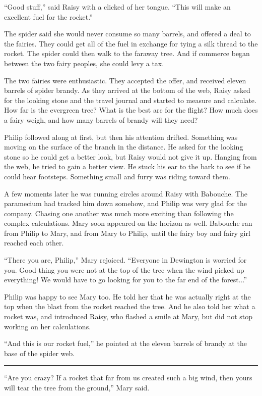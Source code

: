 \documentclass[10pt, draft]{memoir}
\renewcommand{\pfbreakdisplay}{\bigskip \ding{166} \bigskip}
\newcommand{\secbreak}{\fancybreak{\pfbreakdisplay}}
\begin{document}
``Good stuff,'' said Raisy with a clicked of her tongue. ``This will make an excellent fuel for the rocket.''

The spider said she would never consume so many barrels, and offered a deal to the fairies. They could get all of the fuel in exchange for tying a silk thread to the rocket. The spider could then walk to the faraway tree. And if commerce began between the two fairy peoples, she could levy a tax.

The two fairies were enthusiastic. They accepted the offer, and received eleven barrels of spider brandy. As they arrived at the bottom of the web, Raisy asked for the looking stone and the travel journal and started to measure and calculate. How far is the evergreen tree? What is the best arc for the flight? How much does a fairy weigh, and how many barrels of brandy will they need?

Philip followed along at first, but then his attention drifted. Something was moving on the surface of the branch in the distance. He asked for the looking stone so he could get a better look, but Raisy would not give it up. Hanging from the web, he tried to gain a better view. He stuck his ear to the bark to see if he could hear footsteps. Something small and furry was riding toward them.

A few moments later he was running circles around Raisy with Babouche. The paramecium had tracked him down somehow, and Philip was very glad for the company. Chasing one another was much more exciting than following the complex calculations. Mary soon appeared on the horizon as well. Babouche ran from Philip to Mary, and from Mary to Philip, until the fairy boy and fairy girl reached each other.

``There you are, Philip,'' Mary rejoiced. ``Everyone in Dewington is worried for you. Good thing you were not at the top of the tree when the wind picked up everything! We would have to go looking for you to the far end of the forest...''

Philip was happy to see Mary too. He told her that he was actually right at the top when the blast from the rocket reached the tree. And he also told her what a rocket was, and introduced Raisy, who flashed a smile at Mary, but did not stop working on her calculations.

``And this is our rocket fuel,'' he pointed at the eleven barrels of brandy at the base of the spider web.

\secbreak

``Are you crazy? If a rocket that far from us created such a big wind, then yours will tear the tree from the ground,'' Mary said.
\end{document}
